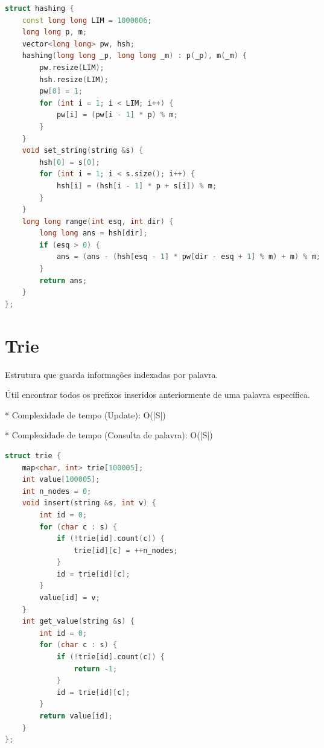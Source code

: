 \documentclass[11pt, a4paper, oneside]{book}
\begin{document}
\begin{multicols}{2}
\begin{lstlisting}[language=C++]
struct hashing {
    const long long LIM = 1000006;
    long long p, m;
    vector<long long> pw, hsh;
    hashing(long long _p, long long _m) : p(_p), m(_m) {
        pw.resize(LIM);
        hsh.resize(LIM);
        pw[0] = 1;
        for (int i = 1; i < LIM; i++) {
            pw[i] = (pw[i - 1] * p) % m;
        }
    }
    void set_string(string &s) {
        hsh[0] = s[0];
        for (int i = 1; i < s.size(); i++) {
            hsh[i] = (hsh[i - 1] * p + s[i]) % m;
        }
    }
    long long range(int esq, int dir) {
        long long ans = hsh[dir];
        if (esq > 0) {
            ans = (ans - (hsh[esq - 1] * pw[dir - esq + 1] % m) + m) % m;
        }
        return ans;
    }
};
\end{lstlisting}
\end{multicols}

\hfill

\section{Trie}


Estrutura que guarda informações indexadas por palavra.   



Útil encontrar todos os prefixos inseridos anteriormente de uma palavra específica.



* Complexidade de tempo (Update): O(|S|)

* Complexidade de tempo (Consulta de palavra): O(|S|)

\hfill

\begin{multicols}{2}
\begin{lstlisting}[language=C++]
struct trie {
    map<char, int> trie[100005];
    int value[100005];
    int n_nodes = 0;
    void insert(string &s, int v) {
        int id = 0;
        for (char c : s) {
            if (!trie[id].count(c)) {
                trie[id][c] = ++n_nodes;
            }
            id = trie[id][c];
        }
        value[id] = v;
    }
    int get_value(string &s) {
        int id = 0;
        for (char c : s) {
            if (!trie[id].count(c)) {
                return -1;
            }
            id = trie[id][c];
        }
        return value[id];
    }
};
\end{lstlisting}
\end{multicols}
\end{document}
